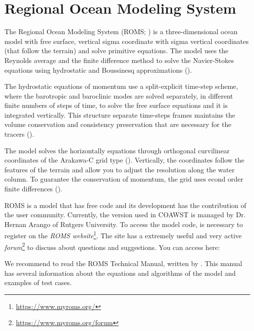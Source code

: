 
\section{Regional Ocean Modeling System}\label{romssecao}
\bigskip
\noindent The Regional Ocean Modeling System (ROMS; \cite{Shchepetkin2005}) is a three-dimensional ocean model with free surface, vertical sigma coordinate 
with sigma vertical coordinates (that follow the terrain) and solve primitive equations. The model uses the Reynolds average and the finite difference method to 
solve the Navier-Stokes equations using hydrostatic and Boussinesq approximations (\cite{Haidvogel2008}).
\bigskip

\noindent The hydrostatic equations of momentum use a split-explicit time-step scheme, where the barotropic and baroclinic modes are solved separately, in
different finite numbers of steps of time, to solve the free surface equations and it is integrated vertically. This structure separate time-steps frames maintains 
the volume conservation and consistency preservation that are necessary for the tracers (\cite{Shchepetkin2005, Haidvogel2008}).
\bigskip

\noindent The model solves the horizontally equations through orthogonal curvilinear coordinates of the Arakawa-C grid type (\cite{Arakawa1977}). Vertically, the 
coordinates follow the features of the terrain and allow you to adjust the resolution along the water column. To guarantee the conservation of momentum, the grid uses
econd order finite differences (\cite{Haidvogel2008}).
\bigskip

\noindent ROMS is a model that has free code and its development has the contribution of the user community. Currently, the version used in COAWST is managed by Dr.
Hernan Arango of Rutgers University. To access the model code, is necessary to register on the
\textcolor{bleu_cite}{\textit{ROMS website}\footnote{\textcolor{bleu_cite}{\href{https://www.myroms.org/}{https://www.myroms.org/}}}}. 
The site has a extremely useful and very active \textcolor{bleu_cite}{\textit{forum}\footnote{\textcolor{bleu_cite}{\href{https://www.myroms.org/forum}{https://www.myroms.org/forum}}}} 
to discuss about questions and suggestions. You can access here:
\bigskip


\noindent We recommend to read the ROMS Technical Manual, written by \textcite{hedstrom2018}. This manual has several
information about the equations and algorithms of the model and examples of test cases.

